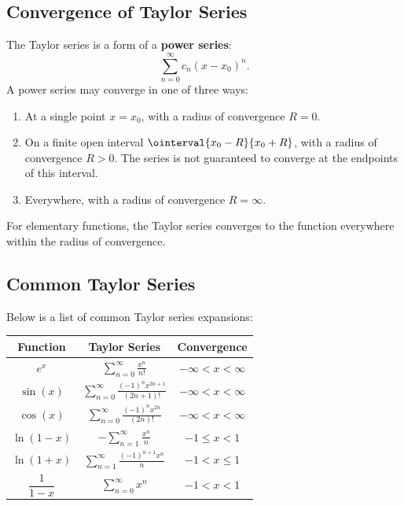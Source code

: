 \documentclass{article}
\begin{document}
\subsection{Convergence of Taylor Series}
The Taylor series is a form of a \textbf{power series}:
\begin{equation*}
    \sum_{n=0}^{\infty} c_n {\left( x - x_0 \right)}^n.
\end{equation*}
A power series may converge in one of three ways:
\begin{enumerate}[label=(\arabic*)]
    \item At a single point \(x = x_0\), with a radius of convergence
          \(R = 0\).
    \item On a finite open interval \(\ointerval{x_0 - R}{x_0 + R}\),
          with a radius of convergence \(R > 0\). The series is not
          guaranteed to converge at the endpoints of this interval.
    \item Everywhere, with a radius of convergence \(R = \infty\).
\end{enumerate}
For elementary functions, the Taylor series converges to the function
everywhere within the radius of convergence.
\subsection{Common Taylor Series}
Below is a list of common Taylor series expansions:
\begin{table}[H]
    \centering
    \begin{tabular}{c c c}
        \toprule
        \textbf{Function}             & \textbf{Taylor Series}                                                                           & \textbf{Convergence}     \\
        \midrule
        \(e^x\)                       & \(\displaystyle\sum_{n=0}^{\infty} \frac{x^n}{n!}\)                                              & \(-\infty < x < \infty\) \\
        \(\sin{\left( x \right)}\)    & \(\displaystyle\sum_{n=0}^{\infty} \frac{{\left( -1 \right)}^n x^{2n+1}}{\left( 2n+1 \right)!}\) & \(-\infty < x < \infty\) \\
        \(\cos{\left( x \right)}\)    & \(\displaystyle\sum_{n=0}^{\infty} \frac{{\left( -1 \right)}^n x^{2n}}{\left( 2n \right)!}\)     & \(-\infty < x < \infty\) \\
        \(\ln{\left( 1 - x \right)}\) & \(\displaystyle-\sum_{n=1}^{\infty} \frac{x^n}{n}\)                                              & \(-1 \leqslant x < 1\)   \\
        \(\ln{\left( 1 + x \right)}\) & \(\displaystyle\sum_{n=1}^{\infty} \frac{{\left( -1 \right)}^{n+1} x^n}{n}\)                     & \(-1 < x \leqslant 1\)   \\
        \(\dfrac{1}{1 - x}\)          & \(\displaystyle\sum_{n=0}^{\infty} x^n\)                                                         & \(-1 < x < 1\)           \\
        \bottomrule
    \end{tabular}
\end{table}
\end{document}
